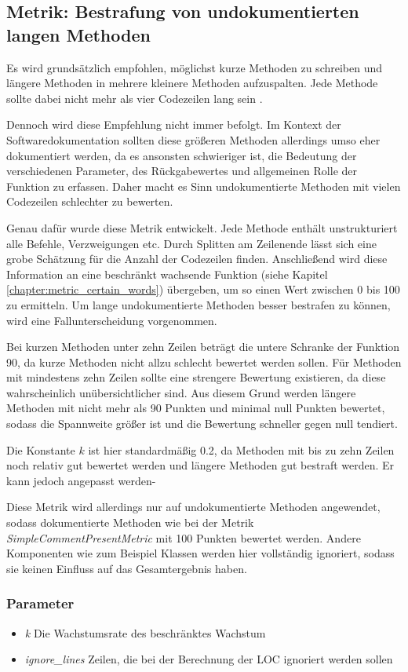  \subsection{Metrik: Bestrafung von undokumentierten langen Methoden}\label{chapter:method_long}
Es wird grundsätzlich empfohlen, möglichst kurze Methoden zu schreiben und längere Methoden in mehrere kleinere Methoden aufzuspalten. Jede Methode sollte dabei nicht mehr als vier Codezeilen lang sein \cite[S. 34]{martin2009clean}.
 
 Dennoch wird diese Empfehlung nicht immer befolgt. Im Kontext der Softwaredokumentation sollten diese größeren Methoden allerdings umso eher dokumentiert werden, da es ansonsten schwieriger ist, die Bedeutung der verschiedenen Parameter, des Rückgabewertes und allgemeinen Rolle der Funktion zu erfassen. Daher macht es Sinn undokumentierte Methoden mit vielen Codezeilen schlechter zu bewerten.
 
 Genau dafür wurde diese Metrik entwickelt. Jede Methode enthält unstrukturiert alle Befehle, Verzweigungen etc. Durch Splitten am Zeilenende lässt sich eine grobe Schätzung für die Anzahl der Codezeilen finden. Anschließend wird diese Information an eine beschränkt wachsende Funktion (siehe Kapitel \ref{chapter:metric_certain_words}) übergeben, um so einen Wert zwischen 0 bis 100 zu ermitteln. 
  Um lange undokumentierte Methoden besser bestrafen zu können, wird eine Fallunterscheidung vorgenommen.
 
 Bei kurzen Methoden unter zehn Zeilen beträgt die untere Schranke der Funktion 90, da kurze Methoden nicht allzu schlecht bewertet werden sollen. Für Methoden mit mindestens zehn Zeilen sollte eine strengere Bewertung existieren, da diese wahrscheinlich unübersichtlicher sind. Aus diesem Grund werden längere Methoden mit nicht mehr als 90 Punkten und minimal null Punkten bewertet, sodass die Spannweite größer ist und die Bewertung schneller gegen null tendiert.
 
 Die Konstante $k$ ist hier standardmäßig  0.2, da Methoden mit bis zu zehn Zeilen noch relativ gut bewertet werden und längere Methoden gut bestraft werden. Er kann jedoch angepasst werden-
 
 Diese Metrik wird allerdings nur auf undokumentierte Methoden angewendet, sodass dokumentierte Methoden wie bei der Metrik \textit{SimpleCommentPresentMetric} mit 100 Punkten bewertet werden. Andere Komponenten wie zum Beispiel Klassen werden hier vollständig ignoriert, sodass sie keinen Einfluss auf das Gesamtergebnis haben.
 \subsubsection{Parameter}
 \begin{itemize}
     \item \textit{k} Die Wachstumsrate des beschränktes Wachstum
     \item \textit{ignore\_lines} Zeilen, die bei der Berechnung der \ac{LOC} ignoriert werden sollen
 \end{itemize}
     

